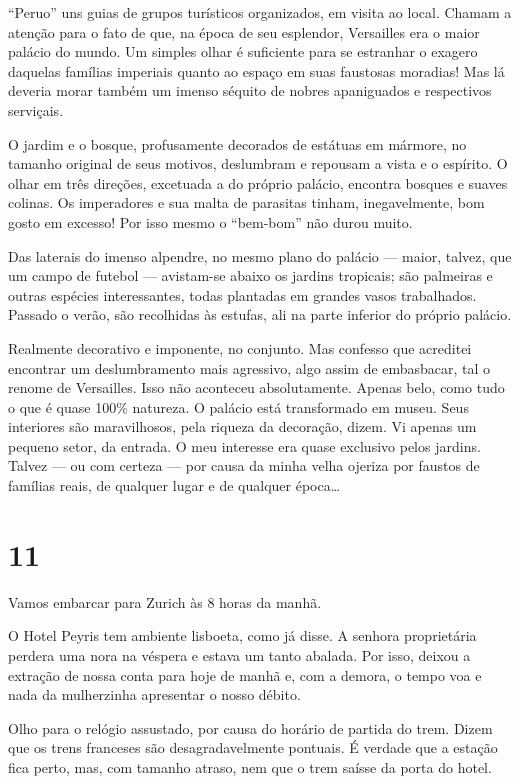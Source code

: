 ``Peruo'' uns guias de grupos turísticos organizados, em visita ao local. Chamam a atenção para o fato de que, na época de seu esplendor, Versailles era o maior palácio do mundo. Um simples olhar é suficiente para se estranhar o exagero daquelas famílias imperiais quanto ao espaço em suas faustosas moradias! Mas lá deveria morar também um imenso séquito de nobres apaniguados e respectivos serviçais.

O jardim e o bosque, profusamente decorados de estátuas em mármore, no tamanho original de seus motivos, deslumbram e repousam a vista e o espírito. O olhar em três direções, excetuada a do próprio palácio, encontra bosques e suaves colinas. Os imperadores e sua malta de parasitas tinham, inegavelmente, bom gosto em excesso! Por isso mesmo o ``bem-bom'' não durou muito.

Das laterais do imenso alpendre, no mesmo plano do palácio --- maior, talvez, que um campo de futebol --- avistam-se abaixo os jardins tropicais; são palmeiras e outras espécies interessantes, todas plantadas em grandes vasos trabalhados. Passado o verão, são recolhidas às estufas, ali na parte inferior do próprio palácio.

Realmente decorativo e imponente, no conjunto. Mas confesso que acreditei encontrar um deslumbramento mais agressivo, algo assim de embasbacar, tal o renome de Versailles. Isso não aconteceu absolutamente. Apenas belo, como tudo o que é quase 100\% natureza. O palácio está transformado em museu. Seus interiores são maravilhosos, pela riqueza da decoração, dizem. Vi apenas um pequeno setor, da entrada. O meu interesse era quase exclusivo pelos jardins. Talvez --- ou com certeza --- por causa da minha velha ojeriza por faustos de famílias reais, de qualquer lugar e de qualquer época\ldots

\section*{11 \adfflatleafright {}}
Vamos embarcar para Zurich às 8 horas da manhã.

O Hotel Peyris tem ambiente lisboeta, como já disse. A senhora proprietária perdera uma nora na véspera e estava um tanto abalada. Por isso, deixou a extração de nossa conta para hoje de manhã e, com a demora, o tempo voa e nada da mulherzinha apresentar o nosso débito.

Olho para o relógio assustado, por causa do horário de partida do trem. Dizem que os trens franceses são desagradavelmente pontuais. É verdade que a estação fica perto, mas, com tamanho atraso, nem que o trem saísse da porta do hotel.

